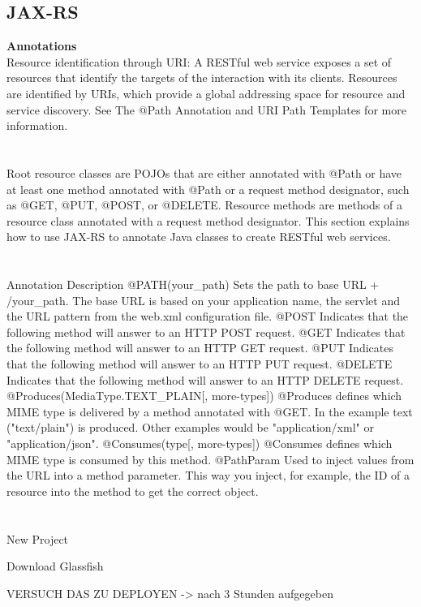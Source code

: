 \documentclass[12pt]{article}
\begin{document}
\subsection{JAX-RS}
\textbf{Annotations}\\
Resource identification through URI: A RESTful web service exposes a set of resources that identify the targets of the interaction with its clients. Resources are identified by URIs, which provide a global addressing space for resource and service discovery. See The @Path Annotation and URI Path Templates for more information.
\\ \\ \\
Root resource classes are POJOs that are either annotated with @Path or have at least one method annotated with @Path or a request method designator, such as @GET, @PUT, @POST, or @DELETE. Resource methods are methods of a resource class annotated with a request method designator. This section explains how to use JAX-RS to annotate Java classes to create RESTful web services.\cite{javaEE6}
\\ \\ \\
Annotation	Description
@PATH(your_path)	Sets the path to base URL + /your_path. The base URL is based on your application name, the servlet and the URL pattern from the web.xml configuration file.
@POST	Indicates that the following method will answer to an HTTP POST request.
@GET	Indicates that the following method will answer to an HTTP GET request.
@PUT	Indicates that the following method will answer to an HTTP PUT request.
@DELETE	Indicates that the following method will answer to an HTTP DELETE request.
@Produces(MediaType.TEXT_PLAIN[, more-types])	@Produces defines which MIME type is delivered by a method annotated with @GET. In the example text ("text/plain") is produced. Other examples would be "application/xml" or "application/json".
@Consumes(type[, more-types])	@Consumes defines which MIME type is consumed by this method.
@PathParam	Used to inject values from the URL into a method parameter. This way you inject, for example, the ID of a resource into the method to get the correct object.
\\ \\ \\




New Project

Download Glassfish

VERSUCH DAS ZU DEPLOYEN -> nach 3 Stunden aufgegeben
\end{document}
